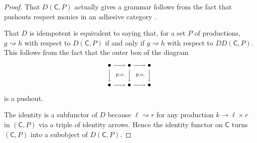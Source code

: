 \documentclass{amsart}
\newcommand{\C}{\cat{C}}
\newcommand{\cat}[1]{\mathsf{#1}}
\newcommand{\dderiv}[2]{#1 \rightsquigarrow #2}
\newcommand{\spn}[3]{#2 \to #1 \times #3}
\theoremstyle{remark}
\theoremstyle{definition}
\begin{document}
\begin{proof}
  That $ D ( \C , P ) $ actually gives a grammar follows from the fact
  that pushouts respect monics in an adhesive category
  \cite[Lem.~12]{LackSobo_Adhesive}.
  
  That $ D $ is idempotent is equivalent to saying that, for a set
  $ P $ of productions, $ \dderiv{g}{h} $ with respect to
  $ D ( \C , P ) $ if and only if $ \dderiv{g}{h} $ with respect to
  $ DD ( \C , P ) $. This follows from the fact that the outer box of
  the diagram
    \[
      \begin{tikzpicture}
        \node (1) at (0,1) {\( \bullet \)};
        \node (2) at (1,1) {\( \bullet \)};
        \node (3) at (2,1) {\( \bullet \)};
        \node (4) at (0,0) {\( \bullet \)};
        \node (5) at (1,0) {\( \bullet \)};
        \node (6) at (2,0) {\( \bullet \)};
        \draw [->] (1) to node [] {\scriptsize{\(  \)}} (2);
        \draw [->] (2) to node [] {\scriptsize{\(  \)}} (3);
        \draw [->] (4) to node [] {\scriptsize{\(  \)}} (5);
        \draw [->] (5) to node [] {\scriptsize{\(  \)}} (6);
        \draw [->] (1) to node [] {\scriptsize{\(  \)}} (4);
        \draw [->] (2) to node [] {\scriptsize{\(  \)}} (5);
        \draw [->] (3) to node [] {\scriptsize{\(  \)}} (6);
        \node () at (0.5,0.5) {\scriptsize{ p.o.\ }};
        \node () at (1.5,0.5) {\scriptsize{ p.o.\ }};
      \end{tikzpicture}
    \]
    is a pushout.

    The identity is a subfunctor of $ D $ because $ \dderiv{\ell}{r} $
    for any production $ \spn{\ell }{k}{r} $ in $ ( \C , P ) $ via a
    triple of identity arrows. Hence the identity functor on $ \C $
    turns $ ( \C , P ) $ into a subobject of $ D ( \C , P ) $.  
\end{proof}
\end{document}
